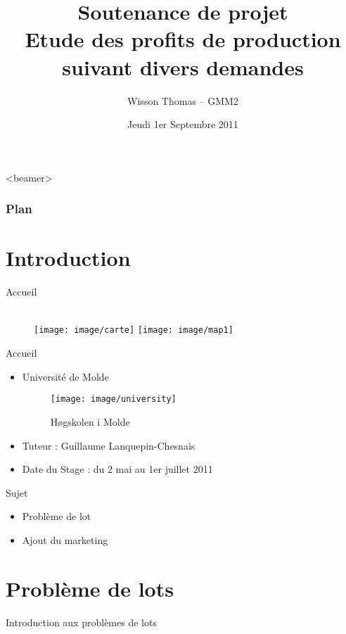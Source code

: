 \documentclass{beamer}
\title[Soutenance de projet]{Soutenance de projet\\Etude des profits de production suivant divers demandes}
\author[WISSON -- GMM2]{Wisson Thomas -- GMM2}
\date{Jeudi 1er Septembre 2011}
\begin{document}
\begin{frame}
\titlepage
\end{frame}



\AtBeginSection
{
\begin{frame}<beamer>
   \frametitle{Plan}
\end{frame}

}


\section{Introduction}
\begin{frame}{Accueil}
    \begin{figure}[H]
        \\
        \texttt{[image: image/carte]}
        \texttt{[image: image/map1]}\\
    \end{figure}
\end{frame}

\begin{frame}{Accueil}
    \begin{itemize}
    \item Université de Molde 
    \begin{figure}[H]
        \texttt{[image: image/university]}\\
        \caption{Høgskolen i Molde}
    \end{figure}
        \item Tuteur : Guillaume Lanquepin-Chesnais
        \item Date du Stage : du 2 mai au 1er juillet 2011
    \end{itemize}
\end{frame}

\begin{frame}{Sujet}
    \begin{itemize}
        \item Problème de lot
        \item Ajout du marketing
    \end{itemize}
\end{frame}

\section{Problème de lots}
\begin{frame}{Introduction aux problèmes de lots}
\end{frame}
\end{document}
